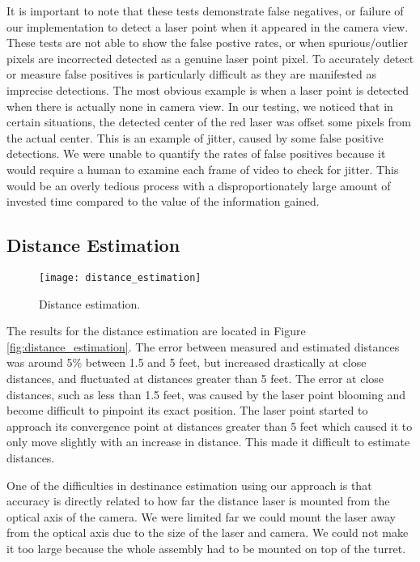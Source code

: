 \documentclass[10pt,twocolumn,letterpaper]{article}
\begin{document}
It is important to note that these tests demonstrate false negatives, or failure of our implementation to detect a laser point when it appeared in the camera view.  These tests are not able to show the false postive rates, or when spurious/outlier pixels are incorrected detected as a genuine laser point pixel.  To accurately detect or measure false positives is particularly difficult as they are manifested as imprecise detections.  The most obvious example is when a laser point is detected when there is actually none in camera view.  In our testing, we noticed that in certain situations, the detected center of the red laser was offset some pixels from the actual center.  This is an example of jitter, caused by some false positive detections.  We were unable to quantify the rates of false positives because it would require a human to examine each frame of video to check for jitter.  This would be an overly tedious process with a disproportionately large amount of invested time compared to the value of the information gained.

\subsection{Distance Estimation}

\begin{figure}[t]
\begin{center}
  \texttt{[image: distance\_estimation]}
\end{center}
   \caption{Distance estimation.}
\label{fig:distance_estimation}
\label{fig:long}
\label{fig:onecol}
\end{figure}

The results for the distance estimation are located in Figure \ref{fig:distance_estimation}. The error between measured and estimated distances was around 5\% between 1.5 and 5 feet, but increased drastically at close distances, and fluctuated at distances greater than 5 feet. The error at close distances, such as less than 1.5 feet, was caused by the laser point blooming and become difficult to pinpoint its exact position. The laser point started to approach its convergence point at distances greater than 5 feet which caused it to only move slightly with an increase in distance. This made it difficult to estimate distances.

One of the difficulties in destinance estimation using our approach is that accuracy is directly related to how far the distance laser is mounted from the optical axis of the camera. We were limited far we could mount the laser away from the optical axis due to the size of the laser and camera. We could not make it too large because the whole assembly had to be mounted on top of the turret.
\end{document}
